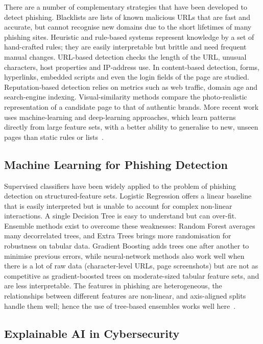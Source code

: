 \documentclass[11pt,a4paper]{article}
\begin{document}
There are a number of complementary strategies that have been developed to detect phishing.
Blacklists are lists of known malicious URLs that are fast and accurate, but cannot
recognise new domains due to the short lifetimes of many phishing sites. Heuristic and
rule-based systems represent knowledge by a set of hand-crafted rules; they are easily
interpretable but brittle and need frequent manual changes. URL-based detection checks the
length of the URL, unusual characters, host properties and IP-address use. In content-based
detection, forms, hyperlinks, embedded scripts and even the login fields of the page are
studied. Reputation-based detection relies on metrics such as web traffic, domain age and
search-engine indexing. Visual-similarity methods compare the photo-realistic representation
of a candidate page to that of authentic brands. More recent work uses machine-learning and
deep-learning approaches, which learn patterns directly from large feature sets, with a
better ability to generalise to new, unseen pages than static rules or lists~\cite{ref1,ref2}.

\subsection{Machine Learning for Phishing Detection}

Supervised classifiers have been widely applied to the problem of phishing detection on
structured-feature sets. Logistic Regression offers a linear baseline that is easily
interpreted but is unable to account for complex non-linear interactions. A single Decision
Tree is easy to understand but can over-fit. Ensemble methods exist to overcome these
weaknesses: Random Forest averages many decorrelated trees, and Extra Trees brings more
randomisation for robustness on tabular data. Gradient Boosting adds trees one after another
to minimise previous errors, while neural-network methods also work well when there is a lot
of raw data (character-level URLs, page screenshots) but are not as competitive as
gradient-boosted trees on moderate-sized tabular feature sets, and are less interpretable.
The features in phishing are heterogeneous, the relationships between different features are
non-linear, and axis-aligned splits handle them well; hence the use of tree-based ensembles
works well here~\cite{ref2,ref5}.

\subsection{Explainable AI in Cybersecurity}
\end{document}
